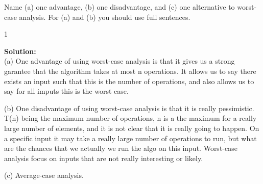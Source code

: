 \documentclass[9pt]{article}
\def\solutions{1}
\begin{document}
\item Name (a) one advantage, (b) one disadvantage, and (c) one alternative to worst-case analysis. For (a) and (b) you should use full sentences.

  \if\solutions1
  \vspace{2mm}
  
  \textbf{Solution:}   \\

  (a) One advantage of using worst-case analysis is that it gives us a strong garantee that the algorithm takes at most n operations. It allows us to say there exists an input such that this is the number of operations, and also allows us to say for all imputs this is the worst case.

  (b) One disadvantage of using worst-case analysis is that it is really pessimistic. T(n) being the maximum number of operations, n is a the maximum for a really large number of elements, and it is not clear that it is really going to happen. On a specific input it may take a really large number of operations to run, but what are the chances that we actually we run the algo on this input. Worst-case analysis focus on inputs that are not really interesting or likely.

  (c) Average-case analysis.



\fi

\newpage




\vspace{5mm}
\end{document}
